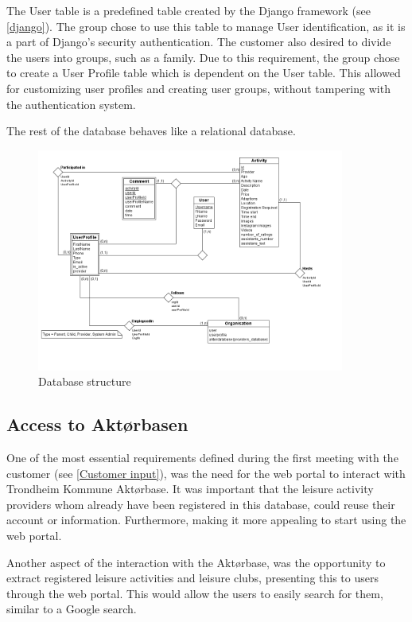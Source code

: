 The User table is a predefined table created by the Django framework (see \ref{django}). The group chose to use this table to manage User identification, as it is a part of Django's security authentication. The customer also desired to divide the users into groups, such as a family. Due to this requirement, the group chose to create a User Profile table which is dependent on the User table. This allowed for customizing user profiles and creating user groups, without tampering with the authentication system. 

The rest of the database behaves like a relational database.

\begin{figure}[ht]
\centering
    \includegraphics[width=0.90\textwidth]{fig/erDatabase}
\caption{Database structure}
\label{Database_Figure}
\end{figure}


\subsection{Access to Aktørbasen}
\label{Aktordatabasen}
One of the most essential requirements defined during the first meeting with the customer (see \ref{Customer input}), was the need for the web portal to interact with Trondheim Kommune Aktørbase. It was important that the leisure activity providers whom already have been registered in this database, could reuse their account or information. Furthermore, making it more appealing to start using the web portal.

Another aspect of the interaction with the Aktørbase, was the opportunity to extract registered leisure activities and leisure clubs, presenting this to users through the  web portal. This would allow the users to easily search for them, similar to a Google search. 

